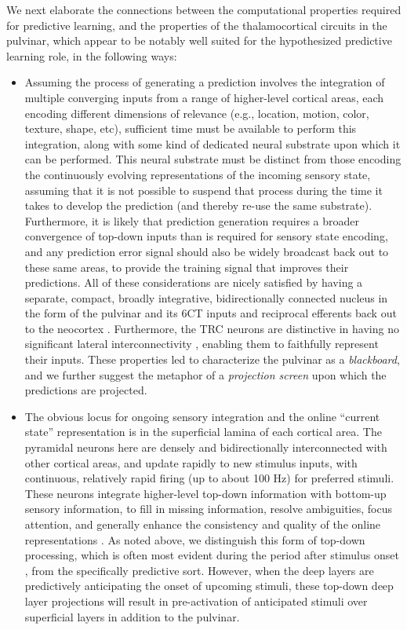 \documentclass[11pt,twoside]{article}
\newif\myifpdf
\begin{document}
We next elaborate the connections between the computational properties required for predictive learning, and the properties of the thalamocortical circuits in the pulvinar, which appear to be notably well suited for the hypothesized predictive learning role, in the following ways:
\begin{itemize}

	\item Assuming the process of generating a prediction involves the integration of multiple converging inputs from a range of higher-level cortical areas, each encoding different dimensions of relevance (e.g., location, motion, color, texture, shape, etc), sufficient time must be available to perform this integration, along with some kind of dedicated neural substrate upon which it can be performed.  This neural substrate must be distinct from those encoding the continuously evolving representations of the incoming sensory state, assuming that it is not possible to suspend that process during the time it takes to develop the prediction (and thereby re-use the same substrate).  Furthermore, it is likely that prediction generation requires a broader convergence of top-down inputs than is required for sensory state encoding, and any prediction error signal should also be widely broadcast back out to these same areas, to provide the training signal that improves their predictions.  All of these considerations are nicely satisfied by having a separate, compact, broadly integrative, bidirectionally connected nucleus in the form of the pulvinar and its 6CT inputs and reciprocal efferents back out to the neocortex \citep{Shipp03}.  Furthermore, the TRC neurons are distinctive in having no significant lateral interconnectivity \citep{ShermanGuillery06}, enabling them to faithfully represent their inputs.  These properties led \citet{Mumford91} to characterize the pulvinar as a \emph{blackboard}, and we further suggest the metaphor of a \emph{projection screen} upon which the predictions are projected.

	\item The obvious locus for ongoing sensory integration and the online ``current state'' representation is in the superficial lamina of each cortical area.  The pyramidal neurons here are densely and bidirectionally interconnected with other cortical areas, and update rapidly to new stimulus inputs, with continuous, relatively rapid firing (up to about 100 Hz) for preferred stimuli.  These neurons integrate higher-level top-down information with bottom-up sensory information, to fill in missing information, resolve ambiguities, focus attention, and generally enhance the consistency and quality of the online representations \citep{DesimoneDuncan95,ReynoldsChelazziDesimone99,MillerCohen01,OReillyWyatteHerdEtAl13,OReillyMunakataFrankEtAl12,OReillyHazyHerd16}. As noted above, we distinguish this form of top-down processing, which is often most evident during the period after stimulus onset \citep{LeeMumford03}, from the specifically predictive sort.  However, when the deep layers are predictively anticipating the onset of upcoming stimuli, these top-down deep layer projections will result in pre-activation of anticipated stimuli over superficial layers in addition to the pulvinar.


\end{itemize}
\end{document}
